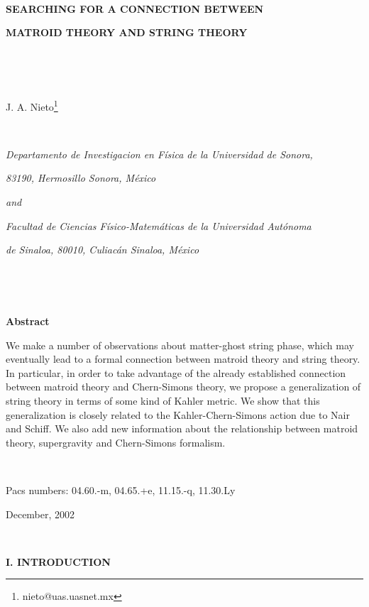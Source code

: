 \documentclass[a4paper,12pt]{article}
\begin{document}
\bigskip

\bigskip\ 

\begin{center}
\textbf{SEARCHING FOR A CONNECTION BETWEEN}

\textbf{MATROID THEORY AND STRING THEORY}

\bigskip\ 

\smallskip\ 

J. A. Nieto\footnote[1]{%
nieto@uas.uasnet.mx}

\smallskip\ 

\textit{Departamento de Investigacion en F\'{i}sica de la Universidad de
Sonora,}

\textit{83190, Hermosillo Sonora, M\'{e}xico}

\textit{and}

\textit{Facultad de Ciencias F\'{i}sico-Matem\'{a}ticas de la Universidad
Aut\'{o}noma}

\textit{de Sinaloa, 80010, Culiac\'{a}n Sinaloa, M\'{e}xico}

\bigskip\ 

\bigskip\ 

\textbf{Abstract}
\end{center}

We make a number of observations about matter-ghost string phase, which may
eventually lead to a formal connection between matroid theory and string
theory. In particular, in order to take advantage of the already established
connection between matroid theory and Chern-Simons theory, we propose a
generalization of string theory in terms of some kind of Kahler metric. We
show that this generalization is closely related to the Kahler-Chern-Simons
action due to Nair and Schiff. We also add new information about the
relationship between matroid theory, \coordHE{} supergravity and Chern-Simons
formalism.

\bigskip\ 

Pacs numbers: 04.60.-m, 04.65.+e, 11.15.-q, 11.30.Ly

December, 2002

\newpage\ 

\noindent \textbf{I. INTRODUCTION}

\bigskip
\end{document}
